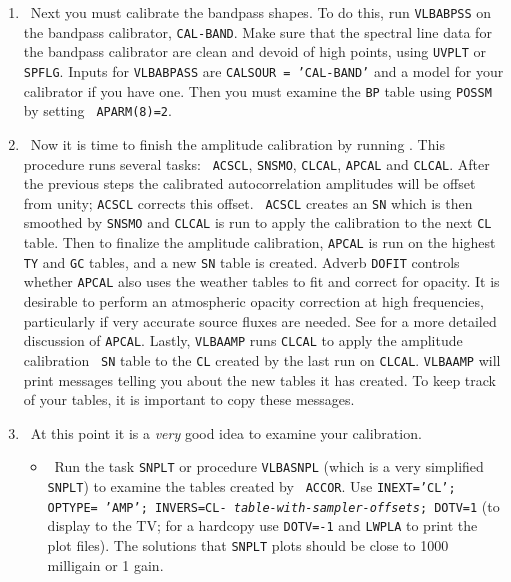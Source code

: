 \begin{enumerate}
\item\ {Next you must calibrate the bandpass shapes.  To do this, run
{\tt VLBABPSS} on the bandpass calibrator, {\tt CAL-BAND}\@.  Make
sure that the spectral line data for the bandpass calibrator are clean
and devoid of high points, using {\tt UVPLT} or {\tt SPFLG}\@.  Inputs
for {\tt VLBABPASS} are {\tt CALSOUR = 'CAL-BAND'} and a model for
your calibrator if you have one.  Then you must examine the {\tt BP}
table using {\tt POSSM} by setting {\tt
  APARM(8)=2}\@.}

\item\ {Now it is time to finish the amplitude calibration by running
{\tt {}}\@. This procedure runs several tasks: {\tt
  ACSCL}, {\tt SNSMO}, {\tt CLCAL}, {\tt APCAL} and {\tt CLCAL}\@.
After the previous steps the calibrated autocorrelation amplitudes
will be offset from unity; {\tt ACSCL} corrects this offset.  {\tt
  ACSCL} creates an {\tt SN} which is then smoothed by {\tt SNSMO} and
{\tt CLCAL} is run to apply the calibration to the next {\tt CL}
table.  Then to finalize the amplitude calibration, {\tt APCAL} is run
on the highest {\tt TY} and {\tt GC} tables, and a new {\tt SN} table
is created.  Adverb {\tt DOFIT} controls whether {\tt APCAL} also uses
the weather tables to fit and correct for opacity.  It is desirable to
perform an atmospheric opacity correction at high frequencies,
particularly if very accurate source fluxes are needed. See
 for a more detailed discussion of {\tt APCAL}\@. Lastly,
{\tt VLBAAMP} runs {\tt CLCAL} to apply the amplitude calibration {\tt
  SN} table to the {\tt CL} created by the last run on {\tt CLCAL}\@.
{\tt VLBAAMP} will print messages telling you about the new tables it
has created. To keep track of your tables, it is important to copy
these messages.}

\item\ {At this point it is a {\it very} good idea to examine your
calibration.}

\begin{itemize}

\item\ {Run the task {\tt SNPLT} or procedure {\tt VLBASNPL} (which is
a very simplified {\tt SNPLT}) to examine the tables created by {\tt
ACCOR}\@.  Use {\tt INEXT='CL'; OPTYPE= 'AMP'; INVERS=CL-{\it
table-with-sampler-offsets}; DOTV=1} (to display to the TV; for a
hardcopy use {\tt DOTV=-1} and {\tt LWPLA} to print the plot files).
The solutions that {\tt SNPLT} plots should be close to 1000 milligain
or 1 gain.}


\end{itemize}
\end{enumerate}
